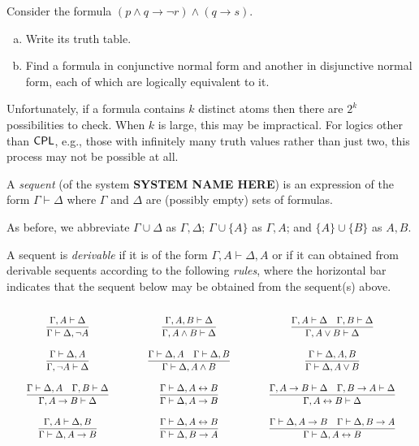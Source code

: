 \documentclass{article}
\begin{document}
\begin{prob}{3.1}
    Consider the formula $(p \wedge q \to \neg r) \wedge (q \to s)$.
    \begin{enumerate}[a)]
        \item Write its truth table.
        \item Find a formula in conjunctive normal form and another in disjunctive normal form, each of which are logically equivalent to it.
    \end{enumerate}
\end{prob}

Unfortunately, if a formula contains $k$ distinct atoms then there are $2^k$ possibilities to check. When $k$ is large, this may be impractical. For logics other than $\mathsf{CPL}$, e.g., those with infinitely many truth values rather than just two, this process may not be possible at all.

\begin{definition}
    A \emph{sequent} (of the system \textbf{SYSTEM NAME HERE}) is an expression of the form $\Gamma \vdash \Delta$ where $\Gamma$ and $\Delta$ are (possibly empty) sets of formulas.
\end{definition}

\begin{notation} 
    As before, we abbreviate $\Gamma \cup \Delta$ as $\Gamma, \Delta$; $\Gamma \cup \{ A \}$ as $\Gamma, A$; and $\{ A \} \cup \{ B \}$ as $A, B$.
\end{notation}

\begin{definition}
    A sequent is \emph{derivable} if it is of the form $\Gamma, A \vdash \Delta, A$ or if it can obtained from derivable sequents according to the following \emph{rules}, where the horizontal bar indicates that the sequent below may be obtained from the sequent(s) above.
\end{definition}

\[ \arraycolsep = 2em \def\arraystretch{3}
\begin{array}{c c c c c c c}
\sequent{\Gamma, A}{\Delta}{\Gamma}{\Delta, \neg A} &
\sequent{\Gamma, A, B}{\Delta}{\Gamma, A \wedge B}{\Delta} &
\doublesequent{\Gamma, A}{\Delta}{\Gamma, B}{\Delta}{\Gamma, A \vee B}{\Delta} 
\\
\sequent{\Gamma}{\Delta, A}{\Gamma, \neg A}{\Delta} &
\doublesequent{\Gamma}{\Delta, A}{\Gamma}{\Delta, B}{\Gamma}{\Delta, A \wedge B} &
\sequent{\Gamma}{\Delta, A, B}{\Gamma}{\Delta, A \vee B}
\\
\doublesequent{\Gamma}{\Delta, A}{\Gamma, B}{\Delta}{\Gamma, A \to B}{\Delta} &
\sequent{\Gamma}{\Delta, A \iff B}{\Gamma}{\Delta, A \to B} &
\doublesequent{\Gamma, A \to B}{\Delta}{\Gamma, B \to A}{\Delta}{\Gamma, A \iff B}{\Delta}
\\
\sequent{\Gamma, A}{\Delta, B}{\Gamma}{\Delta, A \to B} &
\sequent{\Gamma}{\Delta, A \iff B}{\Gamma}{\Delta, B \to A} &
\doublesequent{\Gamma}{\Delta, A \to B}{\Gamma}{\Delta, B \to A}{\Gamma}{\Delta, A \iff B}
\end{array}
\]
\end{document}
